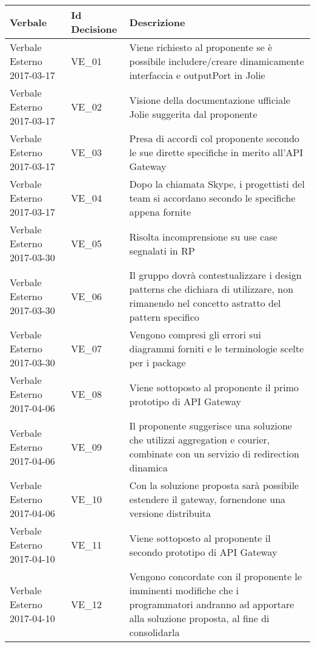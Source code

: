 \normalsize
\begin{longtable}{|>{\centering\arraybackslash}p{4.7cm}|>{\centering\arraybackslash}p{2.5cm} | >{\centering\arraybackslash}p{7cm}|}
	\hline \rowcolor{Gray}
	\textbf{Verbale} & \textbf{Id Decisione} & \textbf{Descrizione}\\
	\hline
	\endhead
			Verbale Esterno 2017-03-17 & VE\_01	& Viene richiesto al proponente se è possibile includere/creare dinamicamente interfaccia e outputPort in Jolie	\\
			\hline
			Verbale Esterno 2017-03-17 & VE\_02 & Visione della documentazione ufficiale Jolie suggerita dal proponente \\
			\hline
			Verbale Esterno 2017-03-17 & VE\_03 & Presa di accordi col proponente secondo le sue dirette specifiche in merito all'API Gateway \\
			\hline
			Verbale Esterno 2017-03-17 & VE\_04 & Dopo la chiamata Skype, i progettisti del team si accordano secondo le specifiche appena fornite \\
			\hline
			Verbale Esterno 2017-03-30 & VE\_05	& Risolta incomprensione su use case segnalati in RP \\
			\hline
			Verbale Esterno 2017-03-30 & VE\_06 & Il gruppo dovrà contestualizzare i design patterns che dichiara di utilizzare, non rimanendo nel concetto astratto del pattern specifico \\
			\hline
			Verbale Esterno 2017-03-30 & VE\_07 & Vengono compresi gli errori sui diagrammi forniti e le terminologie scelte per i package \\
			\hline
			Verbale Esterno 2017-04-06 & VE\_08	& Viene sottoposto al proponente il primo prototipo di API Gateway \\
			\hline
			Verbale Esterno 2017-04-06 & VE\_09 &  Il proponente suggerisce una soluzione che utilizzi aggregation e courier, combinate con un servizio di redirection dinamica \\
			\hline
			Verbale Esterno 2017-04-06 & VE\_10 & Con la soluzione proposta sarà possibile estendere il gateway, fornendone una versione distribuita\\
			\hline
			Verbale Esterno 2017-04-10 & VE\_11	& Viene sottoposto al proponente il secondo prototipo di API Gateway \\
			\hline
			Verbale Esterno 2017-04-10 & VE\_12 & Vengono concordate con il proponente le imminenti modifiche che i programmatori andranno ad apportare alla soluzione proposta, al fine di consolidarla \\

\end{longtable}
